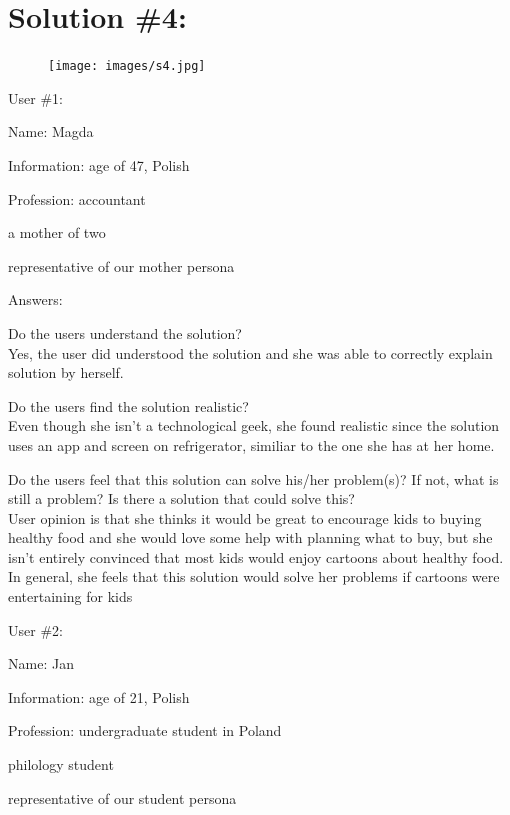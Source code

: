 \documentclass[a4paper,10pt,oneside]{scrreprt}
\begin{document}
\clearpage
\section{Solution \#4:}
\begin{figure}[h]
	\centering
	\texttt{[image: images/s4.jpg]}
\end{figure}
User \#1:
\begin{compactitem}
	\item Name: Magda
	\item Information: age of 47, Polish
	\item Profession: accountant 
	\item a mother of two
	\item representative of our mother persona 
\end{compactitem}
\bigskip

Answers:
\begin{compactitem}
	\item Do the users understand the solution?\\
		Yes, the user did understood the solution and she was able to correctly explain solution by herself.\\
	
	\item Do the users find the solution realistic?\\
		Even though she isn't a technological geek, she found realistic since the solution uses an app and screen on refrigerator, similiar to the one she has at her home.\\
		
	\item Do the users feel that this solution can solve his/her problem(s)? If not, what is still
	a problem? Is there a solution that could solve this?\\
		User opinion is that she thinks it would be great to encourage kids to buying healthy food and she would love some help with planning what to buy, 
but she isn't entirely convinced that most kids would enjoy cartoons about healthy food. In general, she feels that this solution would solve her problems
if cartoons were entertaining for kids

\end{compactitem}
\bigskip
\bigskip
User \#2:
\begin{compactitem}
	\item Name: Jan
	\item Information: age of 21, Polish
	\item Profession: undergraduate student in Poland
	\item philology student
	\item representative of our student persona 
\end{compactitem}
\bigskip
\end{document}
